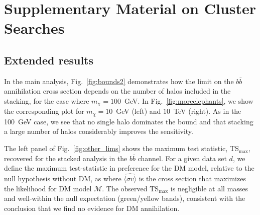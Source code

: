 \chapter{Supplementary Material on Cluster Searches}
\label{supp:clusters}

\section{Extended results}
\label{sec:extended}

In the main analysis, Fig.~\ref{fig:bounds2}  demonstrates how the limit on the  $b\bar b$ annihilation cross section  depends on the number of halos included in the stacking, for the case where  $m_\chi = 100$~GeV. In Fig.~\ref{fig:moreelephants}, we show the corresponding plot for $m_\chi = 10$~GeV (left) and $10$~TeV (right).  As in the 100~GeV case, we see that no single halo dominates the bound and that stacking a large number of halos considerably improves the sensitivity.

The left panel of Fig.~\ref{fig:other_lims} shows the maximum test statistic, TS$_\text{max}$, recovered for the stacked analysis in the $b\bar{b}$ channel.  For a given data set $d$, we define the maximum test-statistic in preference for the DM model, relative to the null hypothesis without DM, as 
where $\widehat{\langle\sigma v\rangle}$ is the cross section that maximizes the likelihood for DM model $\mathcal{M}$.  The observed TS$_\text{max}$ is negligible at all masses and well-within the null expectation (green/yellow bands), consistent with the conclusion that we find no evidence for DM annihilation.  \vspace{0.1in}

